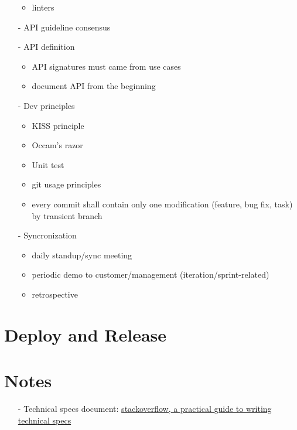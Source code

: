 \documentclass[
	fontsize=10pt, %
	twoside=false, %
	secnumdepth=1, %
]{kaobook}
\begin{document}
\begin{itemize}
\begin{itemize}
				\item linters
			\end{itemize}
		\item[-] API guideline consensus
		\item[-] API definition
			\begin{itemize}
				\item API signatures must came from use cases
				\item document API from the beginning
			\end{itemize}
		\item[-] Dev principles
			\begin{itemize}
				\item KISS principle
				\item Occam's razor
				\item Unit test
				\item git usage principles
				\item every commit shall contain only one modification (feature, bug fix, task) by transient branch
			\end{itemize}
		\item[-] Syncronization
			\begin{itemize}
				\item daily standup/sync meeting
				\item periodic demo to customer/management (iteration/sprint-related)
				\item retrospective
			\end{itemize}
	\end{itemize}


\chapter{Deploy and Release}
\blindtext

\chapter{Notes}
	\begin{itemize}
		\item[-] Technical specs document: \href{https://stackoverflow.blog/2020/04/06/a-practical-guide-to-writing-technical-specs/}{stackoverflow, a practical guide to writing technical specs}
	\end{itemize}
\end{document}
